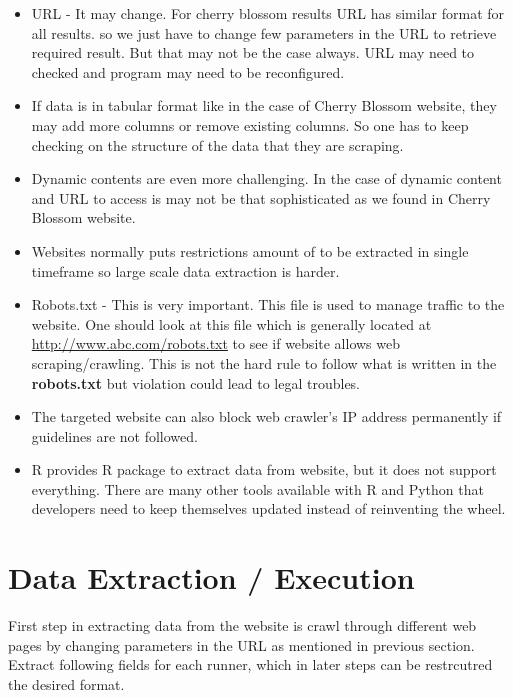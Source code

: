 \documentclass[
]{article}
\providecommand{\tightlist}{%
  \setlength{\itemsep}{0pt}\setlength{\parskip}{0pt}}
\begin{document}
\begin{itemize}
\tightlist
\item
  URL - It may change. For cherry blossom results URL has similar format
  for all results. so we just have to change few parameters in the URL
  to retrieve required result. But that may not be the case always. URL
  may need to checked and program may need to be reconfigured.
\item
  If data is in tabular format like in the case of Cherry Blossom
  website, they may add more columns or remove existing columns. So one
  has to keep checking on the structure of the data that they are
  scraping.
\item
  Dynamic contents are even more challenging. In the case of dynamic
  content and URL to access is may not be that sophisticated as we found
  in Cherry Blossom website.
\item
  Websites normally puts restrictions amount of to be extracted in
  single timeframe so large scale data extraction is harder.
\item
  Robots.txt - This is very important. This file is used to manage
  traffic to the website. One should look at this file which is
  generally located at
  \href{http://www.cherryblossom.org/robots.txt}{http://www.abc.com/robots.txt}
  to see if website allows web scraping/crawling. This is not the hard
  rule to follow what is written in the \textbf{robots.txt} but
  violation could lead to legal troubles.
\item
  The targeted website can also block web crawler's IP address
  permanently if guidelines are not followed.
\item
  R provides R package to extract data from website, but it does not
  support everything. There are many other tools available with R and
  Python that developers need to keep themselves updated instead of
  reinventing the wheel.
\end{itemize}

\newpage

\hypertarget{data-extraction-execution}{%
\section{Data Extraction / Execution}\label{data-extraction-execution}}

First step in extracting data from the website is crawl through
different web pages by changing parameters in the URL as mentioned in
previous section. Extract following fields for each runner, which in
later steps can be restrcutred the desired format.
\end{document}
